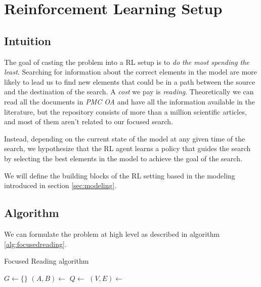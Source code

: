 \documentclass[12pt]{article}
\begin{document}
\section{Reinforcement Learning Setup}
\label{sec:rl}

\subsection{Intuition}
The goal of casting the problem into a RL setup is to \emph{do the most spending the least}. Searching for information about the correct elements in the model are more likely to lead us to find new elements that could be in a path between the source and the destination of the search. A \emph{cost} we pay is \emph{reading}. Theoretically we can read all the documents in \emph{PMC OA} and have all the information available in the literature, but the repository consists of more than a million scientific articles, and most of them aren't related to our focused search.

Instead, depending on the current state of the model at any given time of the search, we hypothesize that the RL agent learns a policy that guides the search by selecting the best elements in the model to achieve the goal of the search.

We will define the building blocks of the RL setting based in the modeling introduced in section \ref{sec:modeling}.

\subsection{Algorithm}
We can formulate the problem at high level as described in algorithm \ref{alg:focusedreading}.

\begin{algorithm}
\caption{Focused Reading algorithm}\label{alg:focusedreading}
\begin{algorithmic}[1]
   \State $G \gets \{\}$ 
   \Repeat
		\State $(A,B) \gets $  \label{alg:chendpoints}
   		\State $Q \gets$ 	\label{alg:chquery}
   		\State $(V, E) \gets$
   		\State {}
\EndProcedure
\end{algorithmic}	
\end{algorithm}
\end{document}
